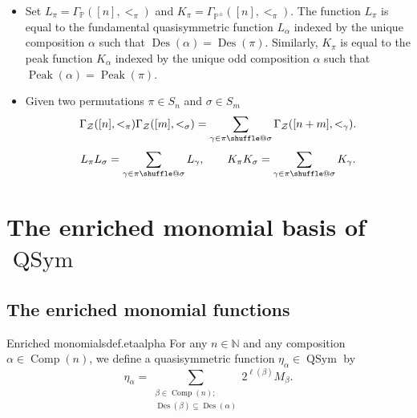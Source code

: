 \documentclass[numbers=enddot,12pt,final,onecolumn,notitlepage]{scrartcl}%
\makeatletter
\newcommand{\al}{\alpha}
\newcommand{\NN}{\mathbb{N}} %
\newcommand{\PP}{\mathbb{P}} %
\newcommand{\QSym}{\operatorname{QSym}}
\newcommand{\Des}{\operatorname{Des}}
\newcommand{\Comp}{\operatorname{Comp}}
\newcommand{\Peak}{\operatorname{Peak}}
\providecommand*{\shuffle}{%
  \mathbin{\mathpalette\shuffle@{}}%
}
\newcommand*{\shuffle@}[2]{%
  \sbox0{$#1\vcenter{}$}%
  \kern .15\ht0 %
  \rlap{\vrule height .25\ht0 depth 0pt width 2.5\ht0}%
  \raise.1\ht0\hbox to 2.5\ht0{%
    \vrule height 1.75\ht0 depth -.1\ht0 width .17\ht0 %
    \hfill
    \vrule height 1.75\ht0 depth -.1\ht0 width .17\ht0 %
    \hfill
    \vrule height 1.75\ht0 depth -.1\ht0 width .17\ht0 %
  }%
  \kern .15\ht0 %
}
\newcommand{\0}{\phantom{c}}
\let\sumnonlimits\sum
\renewcommand{\sum}{\sumnonlimits\limits}
\makeatother
\begin{document}
\begin{itemize}
\item Set $L_{\pi}= \Gamma_{\PP}([n],<_\pi)$ and $K_{\pi}= \Gamma_{\PP^\pm}([n],<_\pi)$. The function $L_\pi$ is equal to the fundamental quasisymmetric function $L_\al$ indexed by the unique composition $\al$ such that $\Des(\al) = \Des(\pi)$. Similarly, $K_\pi$ is equal to the peak function $K_\al$ indexed by the unique odd composition $\al$ such that $\Peak(\al) = \Peak(\pi)$. 

\item Given two permutations $\pi \in S_n$ and $\sigma \in S_m$\begin{equation}
\label{eq : GGG}
\Gamma_{\mathcal{Z}}([n],<_\pi)\Gamma_{\mathcal{Z}}([m],<_\sigma) = \sum_{\gamma \in \pi \shuffle \sigma}\Gamma_{\mathcal{Z}}([n+m],<_\gamma) .
\end{equation}
\begin{equation}
L_{\pi}L_{\sigma} = \sum_{\gamma \in \pi \shuffle \sigma}L_{\gamma}, \qquad
K_{\pi}K_{\sigma} = \sum_{\gamma \in \pi \shuffle \sigma}K_{\gamma}.
\end{equation}
\end{itemize}
\section{The enriched monomial basis of $\QSym$}
\subsection{The enriched monomial functions}

\begin{definition}{Enriched monomials}{def.etaalpha}
For any $n\in\NN$ and any composition $\alpha
\in \Comp(n)$, we define a quasisymmetric function
$\eta_{\alpha}\in\QSym$ by%
\begin{equation}
\eta_{\alpha}=\sum_{\substack{\beta\in \Comp(n);\\
\Des\left(  \beta\right)  \subseteq \Des\left(  \alpha\right)  }}2^{\ell\left(
\beta\right)  }M_{\beta}. \label{eq.def.etaalpha.def}%
\end{equation}

\end{definition}
\end{document}
